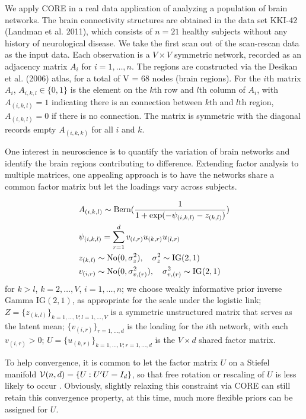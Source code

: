 \documentclass[10pt,fleqn]{article} \pdfoutput=1
\DeclareMathOperator{\1}{\mathbbm{1}} \DeclareMathOperator{\bigO}{\mc O}
\begin{document}
We apply CORE in a real data application of analyzing a population of brain networks. The
brain connectivity structures are obtained in the data set KKI-42 (Landman
et al. 2011), which consists of $n=21$ healthy subjects without any
history of neurological disease. We take the first scan out of the
scan-rescan data as the input data. Each observation is a $V\times V$ symmetric
network, recorded as an adjacency matrix $A_i$ for $i=1,\ldots,n$. The
regions are constructed via the Desikan et al. (2006) atlas, for a total
of V = 68 nodes (brain regions).  For the $i$th matrix $A_i$, $A_{i,k,l} \in \{0,1\}$ is
the element on the $k$th row and $l$th column of $A_i$, with
$A_{(i,k,l)}=1$ indicating there is an connection between $k$th and $l$th
region, $A_{(i,k,l)}=0$ if there is no connection. The matrix is symmetric
with the diagonal records empty $A_{(i,k,k)}$ for all $i$ and $k$.

One interest in neuroscience is to quantify the variation of
brain networks and identify the brain regions contributing to difference.
Extending factor analysis to multiple matrices, one appealing approach is
to have the networks share a common factor matrix but let the  loadings
vary across subjects. 

\begin{equation*} \begin{aligned}
		 & A_{(i,k,l)} \sim \text{Bern}( \frac{1}{1+ \exp(-\psi_{(i,k,l)}-
			z_{(k,l)})})                                                       \\ & \psi_{(i,k,l)} = \sum_{r=1}^{d}  v_{(i,r)} u_{(k,r)}
		u_{(l,r)}\\
		& z_{(k,l)} \sim \operatorname{No}(0,\sigma^2_z),\quad  \sigma^2_z\sim \text{IG}(2,1)\\
		   & v_{(i,r)} \sim \operatorname{No}(0,\sigma^2_{v,(r)}), \quad
		\sigma^2_{v,(r)} \sim \text{IG}(2,1)                                                           
\end{aligned} \end{equation*}
 for
$k>l$, $k=2,\ldots, V$, $i=1,\ldots,n$;  we choose weakly informative prior inverse
Gamma $\text{IG}(2,1)$, as appropriate for the scale under the logistic
link; $Z=\{z_{(k,l)}\}_{k=1,\ldots,V;l=1,\ldots,V}$ is a symmetric unstructured
matrix that serves as the latent mean; $\{ v_{(i,r)}\}_{r=1,\ldots,d}$ is
the loading for the $i$th network, with each $v_{(i,r)}>0$; $U=\{ u_{(k,r)}\}_{ k=1,\ldots,V;r=1,\ldots,d}$ is the $V\times d$ shared factor matrix.

To help convergence, it is common to let the factor matrix $U$ on a Stiefel manifold $\mathcal{V}(n,d)=\{U: U'U=I_d\}$, so that free rotation or rescaling of $U$ is less likely to  occur \citep{hoff2016equivariant}. Obviously, slightly relaxing this constraint via CORE can still retain this convergence property, at this time, much more flexible priors can be assigned for $U$.
\end{document}
